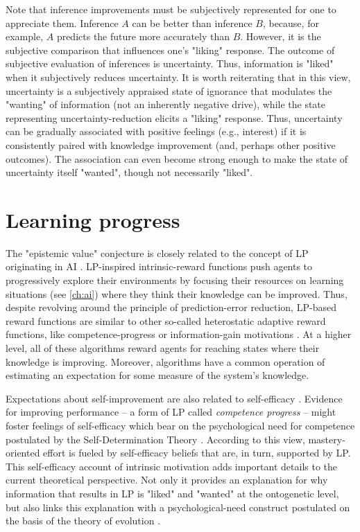 Note that inference improvements must be subjectively represented for one to appreciate them. Inference $A$ can be better than inference $B$, because, for example, $A$ predicts the future more accurately than $B$. However, it is the subjective comparison that influences one's "liking" response. The outcome of subjective evaluation of inferences is uncertainty. Thus, information is "liked" when it subjectively reduces uncertainty. It is worth reiterating that in this view, uncertainty is a subjectively appraised state of ignorance that modulates the "wanting" of information (not an inherently negative drive), while the state representing uncertainty-reduction elicits a "liking" response. Thus, uncertainty can be gradually associated with positive feelings (e.g., interest) if it is consistently paired with knowledge improvement (and, perhaps other positive outcomes). The association can even become strong enough to make the state of uncertainty itself "wanted", though not necessarily "liked".

\section{Learning progress}

The "epistemic value" conjecture is closely related to the concept of \ac{LP} originating in \ac{AI} \cite[e.g., ][]{schmidhuber_curious_1991,oudeyer_intrinsic_2007}. \ac{LP}-inspired intrinsic-reward functions push agents to progressively explore their environments by focusing their resources on learning situations (see \autoref{ch:ai}) where they think their knowledge can be improved. Thus, despite revolving around the principle of prediction-error reduction, \ac{LP}-based reward functions are similar to other so-called heterostatic adaptive reward functions, like competence-progress or information-gain motivations \cite{oudeyer_what_2007}. At a higher level, all of these algorithms reward agents for reaching states where their knowledge is improving. Moreover,  algorithms have a common operation of estimating an expectation for some measure of the system's knowledge. 

Expectations about self-improvement are also related to self-efficacy \cite{bandura_self-efficacy_1977}. Evidence for improving performance  -- a form of \ac{LP} called \emph{competence progress} \cite[see ][]{oudeyer_what_2007} -- might foster feelings of self-efficacy which bear on the psychological need for competence \cite{blain_intrinsic_2021} postulated by the Self-Determination Theory \cite{ryan_self-determination_2000}. According to this view, mastery-oriented effort is fueled by self-efficacy beliefs that are, in turn, supported by \ac{LP}. This self-efficacy account of intrinsic motivation adds important details to the current theoretical perspective. Not only it provides an explanation for why information that results in \ac{LP} is "liked" and "wanted" at the ontogenetic level, but also links this explanation with a psychological-need construct postulated on the basis of the theory of evolution \cite{ryan_self-determination_2017}. 

